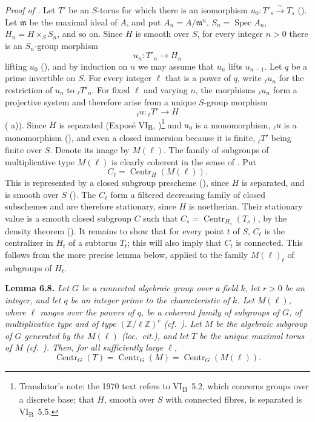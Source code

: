 \emph{Proof of .} Let \(T'\) be an \(S\)-torus for which there is an isomorphism
\(u_0:T'_s\xrightarrow{\sim}T_s\) (). Let \(\mathfrak m\) be the
maximal ideal of \(A\), and put \(A_n=A/\mathfrak m^n\),
\(S_n=\operatorname{Spec}A_n\), \(H_n=H\times_S S_n\), and so on. Since \(H\) is
smooth over \(S\), for every integer \(n>0\) there is an \(S_n\)-group morphism
\[
u_n:T'_n\longrightarrow H_n
\]
lifting \(u_0\) (), and by induction on \(n\) we may assume that
\(u_n\) lifts \(u_{n-1}\). Let \(q\) be a prime invertible on \(S\). For every
integer \(\ell\) that is a power of \(q\), write \({}_{\ell}u_n\) for the restriction
of \(u_n\) to \({}_{\ell}T'_n\). For fixed \(\ell\) and varying \(n\), the morphisms
\({}_{\ell}u_n\) form a projective system and therefore arise from a unique
\(S\)-group morphism
\[
{}_{\ell}u:{}_{\ell}T'\longrightarrow H
\]
( a)). Since \(H\) is separated (Exposé VI\textsubscript{B}, )\footnote{Translator's note: the 1970 text refers to VI\textsubscript{B}~5.2, which concerns groups over a discrete base; that \(H\), smooth over \(S\) with connected fibres, is separated is VI\textsubscript{B}~5.5.} and \(u_0\) is
a monomorphism, \({}_{\ell}u\) is a monomorphism (), and even a closed
immersion because it is finite, \({}_{\ell}T'\) being finite over \(S\). Denote its
image by \(M(\ell)\). The family of subgroups of multiplicative type \(M(\ell)\) is
clearly coherent in the sense of . Put
\[
C_\ell=\operatorname{Centr}_H(M(\ell)).
\]
This is represented by a closed subgroup prescheme (), since \(H\) is separated,
and is smooth over \(S\) (). The \(C_\ell\) form a filtered decreasing
family of closed subschemes and are therefore stationary, since \(H\) is noetherian.
Their stationary value is a smooth closed subgroup \(C\) such that
\(C_s=\operatorname{Centr}_{H_s}(T_s)\), by the density theorem ().
It remains to show that for every point \(t\) of \(S\), \(C_t\) is the centralizer
in \(H_t\) of a subtorus \(T_t\); this will also imply that \(C_t\) is connected.
This follows from the more precise lemma below, applied to the family
\(M(\ell)_t\) of subgroups of \(H_t\).

\textbf{Lemma 6.8.} \emph{Let \(G\) be a connected algebraic group over a field
\(k\), let \(r>0\) be an integer, and let \(q\) be an integer prime to the
characteristic
of \(k\). Let \(M(\ell)\), where \(\ell\) ranges over the powers of \(q\), be a
coherent family of subgroups of \(G\), of multiplicative type and of type
\((\mathbb Z/\ell\mathbb Z)^r\) (cf.~). Let \(M\) be the algebraic subgroup of
\(G\) generated by the \(M(\ell)\) (\emph{loc.~cit.}), and let \(T\) be the unique
maximal torus of \(M\) (cf.~). Then, for all sufficiently large \(\ell\),
\[
\operatorname{Centr}_G(T)=\operatorname{Centr}_G(M)
  =\operatorname{Centr}_G(M(\ell)).
\]}

